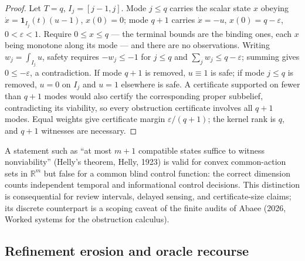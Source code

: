 \documentclass[10pt,twocolumn]{article}
\theoremstyle{plain}
\theoremstyle{definition}
\theoremstyle{remark}
\begin{document}
\begin{proof}
Let \(T = q\), \(I_j = [j-1, j]\). Mode \(j \le q\) carries the scalar state \(x\) obeying
\(\dot x = \mathbf{1}_{I_j}(t)(u - 1)\), \(x(0) = 0\); mode \(q+1\)
carries \(\dot x = -u\), \(x(0) = q - \varepsilon\), \(0 < \varepsilon
< 1\). Require \(0 \le x \le q\) --- the terminal bounds are the binding
ones, each \(x\) being monotone along its mode --- and there are no
observations. Writing
\(w_j = \int_{I_j} u\), safety requires \(-w_j \le -1\) for \(j \le q\) and
\(\sum_j w_j \le q - \varepsilon\); summing gives \(0 \le -\varepsilon\), a
contradiction. If mode \(q+1\) is removed, \(u \equiv 1\) is safe; if mode
\(j \le q\) is removed, \(u = 0\) on \(I_j\) and \(u = 1\) elsewhere is
safe. A certificate supported on fewer than \(q+1\) modes would also
certify the corresponding proper subbelief, contradicting its viability, so
every obstruction certificate involves all \(q+1\) modes. Equal weights give certificate margin \(\varepsilon/(q+1)\); the
kernel rank is \(q\), and \(q+1\) witnesses are necessary.
\end{proof}

A statement such as ``at most \(m+1\) compatible states suffice to witness
nonviability'' (Helly's theorem, Helly, 1923) is valid for convex common-action sets in \(\mathbb{R}^m\) but
false for a common blind control function: the correct dimension counts
independent temporal and informational control decisions. This distinction
is consequential for review intervals, delayed sensing, and
certificate-size claims; its discrete counterpart is a scoping caveat of the
finite audits of Abaee (2026, Worked systems for the obstruction calculus).

\subsection{Refinement erosion and oracle recourse}\label{lp-erosion}
\end{document}
